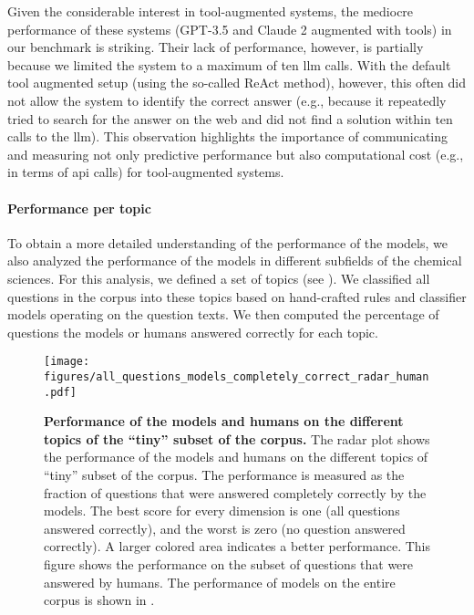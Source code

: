 \documentclass[11pt, oneside]{article}
\begin{document}
\begin{refsection}
Given the considerable interest in tool-augmented systems, the mediocre performance of these systems (GPT-3.5 and Claude 2 augmented with tools) in our benchmark is striking. 
Their lack of performance, however, is partially because we limited the system to a maximum of ten \gls{llm} calls.
With the default tool augmented setup (using the so-called ReAct method\autocite{yao2022react}), however, this often did not allow the system to identify the correct answer (e.g., because it repeatedly tried to search for the answer on the web and did not find a solution within ten calls to the \gls{llm}).
This observation highlights the importance of communicating and measuring not only predictive performance but also computational cost (e.g., in terms of \gls{api} calls) for tool-augmented systems.


\paragraph{Performance per topic} To obtain a more detailed understanding of the performance of the models, we also analyzed the performance of the models in different subfields of the chemical sciences.
For this analysis, we defined a set of topics (see ). We classified all questions in the \chembench corpus into these topics based on hand-crafted rules and classifier models operating on the question texts.
We then computed the percentage of questions the models or humans answered correctly for each topic.
\begin{figure}[!h]
    \centering
    \texttt{[image: figures/all\_questions\_models\_completely\_correct\_radar\_human.pdf]}
    \caption{\textbf{Performance of the models and humans on the different topics of the \enquote{tiny} subset of the \chembench corpus.} The radar plot shows the performance of the models and humans on the different topics of \enquote{tiny} subset of the \chembench corpus. The performance is measured as the fraction of questions that were answered completely correctly by the models.
    The best score for every dimension is one (all questions answered correctly), and the worst is zero (no question answered correctly). A larger colored area indicates a better performance.
    This figure shows the performance on the subset of questions that were answered by humans. The performance of models on the entire corpus is shown in .
    }
    \label{fig:all_questions_models_completely_correct_radar_human}
\end{figure}



\end{refsection}
\end{document}
